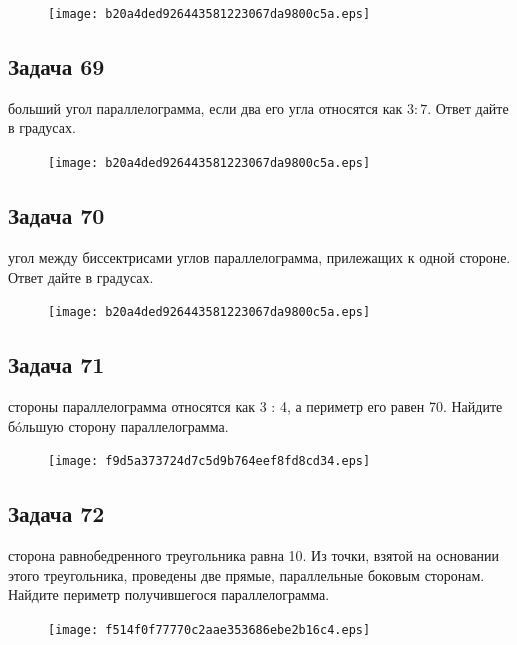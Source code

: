 \documentclass[a4paper,10pt]{article} %
\begin{document}
\begin{spacing}{1.0}
{\begin{figure}{\texttt{[image: b20a4ded926443581223067da9800c5a.eps]}}\end{figure}
\subsection*{Задача 69}
 больший угол параллелограмма, если два его угла относятся как $3 : 7$. Ответ дайте в градусах.

\vspace{1.5cm}

\begin{figure}{\texttt{[image: b20a4ded926443581223067da9800c5a.eps]}}\end{figure}
\subsection*{Задача 70}
 угол между биссектрисами углов параллелограмма, прилежащих к одной стороне. Ответ дайте в градусах.

\vspace{1.5cm}

\begin{figure}{\texttt{[image: b20a4ded926443581223067da9800c5a.eps]}}\end{figure}
\subsection*{Задача 71}
 стороны параллелограмма относятся как 3 : 4, а периметр его равен 70. Найдите б\'oльшую сторону параллелограмма.

\vspace{1.5cm}


\begin{figure}{\texttt{[image: f9d5a373724d7c5d9b764eef8fd8cd34.eps]}}\end{figure}
\subsection*{Задача 72}
 сторона равнобедренного треугольника равна 10. Из точки, взятой на основании этого треугольника, проведены две прямые, параллельные боковым сторонам. Найдите периметр получившегося параллелограмма.

\vspace{1.5cm}

\begin{figure}{\texttt{[image: f514f0f77770c2aae353686ebe2b16c4.eps]}}\end{figure}
}
\end{spacing}
\end{document}
